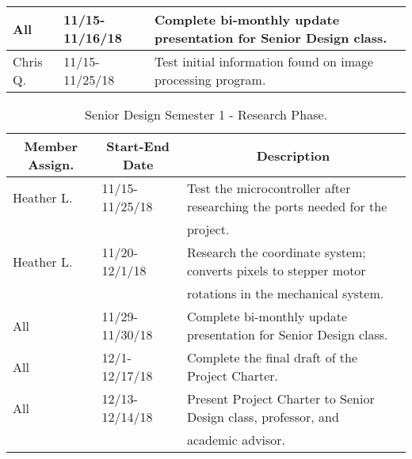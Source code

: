 \begin{table} [H]
\begin{tabular}{|l|l|l|}
		All & 11/15-11/16/18 & Complete bi-monthly update presentation for Senior Design class.\\
		\hline
		Chris Q. & 11/15-11/25/18 & Test initial information found on image processing program.\\
		\hline
	\end{tabular} 
\end{table}	

\setlength{\parindent}{5ex}
\begin{table} [H]	
	\normalsize
	\centering
	\begin{tabular}{|l|l|l|}
		\hline
		\multicolumn{1}{|c|}{\textbf{Member Assign.}} & \multicolumn{1}{|c|}{\textbf{Start-End Date}} & \multicolumn{1}{|c|}{\textbf{Description}} \\
		\hline
		Heather L. & 11/15-11/25/18 & Test the microcontroller after researching the ports needed for the \\
		& & project.\\
		\hline
		Heather L. & 11/20-12/1/18 & Research the coordinate system; converts pixels to stepper motor \\
		& & rotations in the mechanical system.\\
		\hline
		All & 11/29-11/30/18 & 
		Complete bi-monthly update presentation for Senior Design class.\\
		\hline
		All & 12/1-12/17/18 & 
		Complete the final draft of the Project Charter.\\
		\hline
		All & 12/13-12/14/18 & 
		Present Project Charter to Senior Design class, professor, and \\
		& & academic advisor.\\
		\hline
	\end{tabular} 
	\caption{Senior Design Semester 1 - Research Phase.}
	\label{table:2}
\end{table}	

